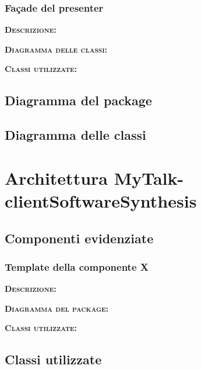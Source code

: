 \subsubsection{Façade del presenter}
\begin{description}
	\item{\scshape\bfseries Descrizione:} 
	\item{\scshape\bfseries Diagramma delle classi:}
	\item{\scshape\bfseries Classi utilizzate:} 
\end{description}

\subsection{Diagramma del package}

\subsection{Diagramma delle classi}
\clearpage

\section{Architettura MyTalk-clientSoftwareSynthesis}

\subsection{Componenti evidenziate}

\subsubsection{Template della componente X}
\begin{description}
	\item{\scshape\bfseries Descrizione:} 
	\item{\scshape\bfseries Diagramma del package:}
	\item{\scshape\bfseries Classi utilizzate:} 
\end{description}

\subsection{Classi utilizzate}


